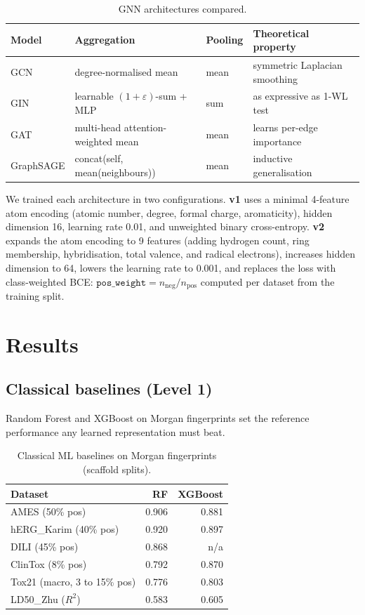 \documentclass[a4paper,11pt]{article}
\begin{document}
\begin{table}[H]
\centering
\caption{GNN architectures compared.}
\label{tab:archs}
\begin{tabular}{llll}
\toprule
\textbf{Model} & \textbf{Aggregation} & \textbf{Pooling} & \textbf{Theoretical property} \\
\midrule
GCN       & degree-normalised mean              & mean & symmetric Laplacian smoothing \\
GIN       & learnable $(1{+}\varepsilon)$-sum + MLP & sum  & as expressive as 1-WL test \\
GAT       & multi-head attention-weighted mean  & mean & learns per-edge importance \\
GraphSAGE & concat(self, mean(neighbours))      & mean & inductive generalisation \\
\bottomrule
\end{tabular}
\end{table}

We trained each architecture in two configurations. \textbf{v1} uses a minimal 4-feature atom encoding (atomic number, degree, formal charge, aromaticity), hidden dimension 16, learning rate 0.01, and unweighted binary cross-entropy. \textbf{v2} expands the atom encoding to 9 features (adding hydrogen count, ring membership, hybridisation, total valence, and radical electrons), increases hidden dimension to 64, lowers the learning rate to 0.001, and replaces the loss with class-weighted BCE: $\texttt{pos\_weight} = n_{\text{neg}} / n_{\text{pos}}$ computed per dataset from the training split.

\section{Results}

\subsection{Classical baselines (Level 1)}
\label{sec:cls_baselines}

Random Forest and XGBoost on Morgan fingerprints set the reference performance any learned representation must beat.

\begin{table}[H]
\centering
\caption{Classical ML baselines on Morgan fingerprints (scaffold splits).}
\label{tab:baselines}
\begin{tabular}{lrr}
\toprule
\textbf{Dataset} & \textbf{RF} & \textbf{XGBoost} \\
\midrule
AMES (50\% pos)            & 0.906 & 0.881 \\
hERG\_Karim (40\% pos)     & 0.920 & 0.897 \\
DILI (45\% pos)            & 0.868 & n/a \\
ClinTox (8\% pos)          & 0.792 & 0.870 \\
Tox21 (macro, 3 to 15\% pos) & 0.776 & 0.803 \\
\midrule
LD50\_Zhu ($R^2$)          & 0.583 & 0.605 \\
\bottomrule
\end{tabular}
\end{table}
\end{document}
